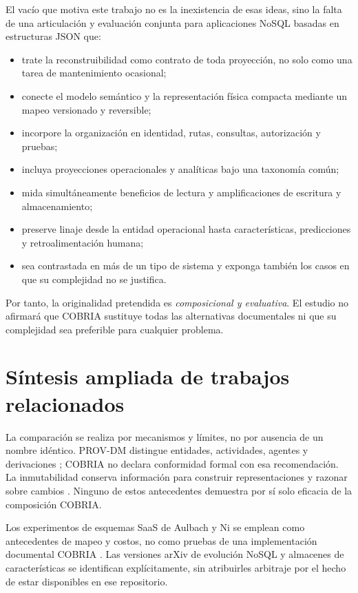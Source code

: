 El vacío que motiva este trabajo no es la inexistencia de esas ideas, sino la falta de
una articulación y evaluación conjunta para aplicaciones NoSQL basadas en estructuras
JSON que:

\begin{itemize}[leftmargin=*]
  \item trate la reconstruibilidad como contrato de toda proyección, no solo como una
  tarea de mantenimiento ocasional;
  \item conecte el modelo semántico y la representación física compacta mediante un
  mapeo versionado y reversible;
  \item incorpore la organización en identidad, rutas, consultas, autorización y pruebas;
  \item incluya proyecciones operacionales y analíticas bajo una taxonomía común;
  \item mida simultáneamente beneficios de lectura y amplificaciones de escritura y
  almacenamiento;
  \item preserve linaje desde la entidad operacional hasta características,
  predicciones y retroalimentación humana;
  \item sea contrastada en más de un tipo de sistema y exponga también los casos en que
  su complejidad no se justifica.
\end{itemize}

Por tanto, la originalidad pretendida es \emph{composicional y evaluativa}. El estudio
no afirmará que COBRIA sustituye todas las alternativas documentales ni que su
complejidad sea preferible para cualquier problema.

\section{Síntesis ampliada de trabajos relacionados}

\COBRIAMetodoLiteratura

La comparación se realiza por mecanismos y límites, no por ausencia de un nombre
idéntico. PROV-DM distingue entidades, actividades, agentes y derivaciones
\parencite{w3c2013prov}; COBRIA no declara conformidad formal con esa recomendación.
La inmutabilidad conserva información para construir representaciones y razonar sobre
cambios \parencite{helland2015immutability}. Ninguno de estos antecedentes demuestra
por sí solo eficacia de la composición COBRIA.

Los experimentos de esquemas SaaS de Aulbach y Ni se emplean como antecedentes de
mapeo y costos, no como pruebas de una implementación documental COBRIA
\parencite{aulbach2009flexibleschemas,ni2014adaptiveschema}. Las versiones arXiv de
evolución NoSQL y almacenes de características se identifican explícitamente, sin
atribuirles arbitraje por el hecho de estar disponibles en ese repositorio.

